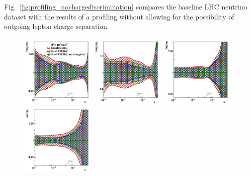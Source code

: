 
%
Fig.~\ref{fig:profiling_nochargediscrimination} compares the baseline LHC neutrino dataset with the results
of a profiling without allowing for the possibility of outgoing lepton charge separation.
\begin{figure}[t]
\centering
\includegraphics[width=0.32\textwidth]{plots/proton_fasernu2/nochargediscrimination/statOnly_FASERv2_q2_10000_pdf_uv_ratio.pdf}
\includegraphics[width=0.32\textwidth]{plots/proton_fasernu2/nochargediscrimination/statOnly_FASERv2_q2_10000_pdf_dv_ratio.pdf}
\includegraphics[width=0.32\textwidth]{plots/proton_fasernu2/nochargediscrimination/statOnly_FASERv2_q2_10000_pdf_g_ratio.pdf}\\
\includegraphics[width=0.32\textwidth]{plots/proton_fasernu2/nochargediscrimination/statOnly_FASERv2_q2_10000_pdf_Sea_ratio.pdf}

\end{figure}
